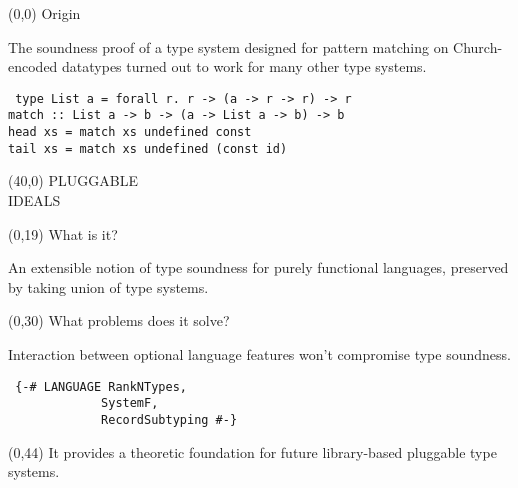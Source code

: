 \documentclass[a0]{a0poster}
\def\FONTSIZE#1{\fontsize{#1}{#1}\selectfont}
\def\HEAD#1{{\FONTSIZE{76}#1}}
\newenvironment{CODE}{\tt\FONTSIZE{36}\null}{}
\begin{document}
\raggedright
\FONTSIZE{48}

\begin{textblock}{37}(0,0)%
\HEAD{Origin}

The soundness proof of a type system designed for pattern
matching on Church-encoded datatypes turned out to work for many
other type systems.

\begin{CODE}
type List a = forall r.~r -> (a -> r -> r) -> r\\
match ::~List a -> b -> (a -> List a -> b) -> b\\
head xs = match xs undefined const\\
tail xs = match xs undefined (const id)\\
\end{CODE}
\end{textblock}

\begin{textblock}{71}(40,0)
{\FONTSIZE{320}%
PLUGGABLE\\%
IDEALS
}
\end{textblock}

\begin{textblock}{34}(0,19)
\HEAD{What is it?}

An extensible notion of type soundness for purely functional
languages, preserved by taking union of type systems.
\end{textblock}

\begin{textblock}{34}(0,30)
\HEAD{What problems does it solve?}

Interaction between optional language features won't compromise
type soundness.

\begin{CODE}
\def\INDENT{~~~~~~~~~~~~~}
\{-\# LANGUAGE RankNTypes,\\
\INDENT SystemF,\\
\INDENT RecordSubtyping \#-\}\\
\end{CODE}
\end{textblock}

\begin{textblock}{30}(0,44)
It provides a theoretic foundation for future library-based
pluggable type systems.
\end{textblock}
\end{document}
